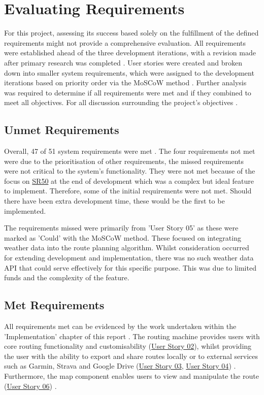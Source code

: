 \clearpage
\section{Evaluating Requirements}
\label{evaluation:requirements}

For this project, assessing its success based solely on the fulfillment of the defined requirements might not provide a comprehensive evaluation. All requirements were established ahead of the three development iterations, with a revision made after primary research was completed . User stories were created and broken down into smaller system requirements, which were assigned to the development iterations based on priority order via the MoSCoW method . Further analysis was required to determine if all requirements were met and if they combined to meet all objectives. For all discussion surrounding the project's objectives .

\subsection{Unmet Requirements}
Overall, 47 of 51 system requirements were met . The four requirements not met were due to the prioritisation of other requirements, the missed requirements were not critical to the system's functionality. They were not met because of the focus on \hyperref[SR:50]{SR50} at the end of development which was a complex but ideal feature to implement. Therefore, some of the initial requirements were not met. Should there have been extra development time, these would be the first to be implemented.

The requirements missed were primarily from 'User Story 05'  as these were marked as 'Could' with the MoSCoW method. These focused on integrating weather data into the route planning algorithm. Whilst consideration occurred for extending development and implementation, there was no such weather data API that could serve effectively for this specific purpose. This was due to limited funds and the complexity of the feature.

\subsection{Met Requirements}
\label{evaluation:requirements:met}
All requirements met can be evidenced by the work undertaken within the 'Implementation' chapter of this report . The routing machine provides users with core routing functionality and customisability (\hyperref[tab:user-story-02]{User Story 02}), whilst providing the user with the ability to export and share routes locally or to external services such as Garmin, Strava and Google Drive (\hyperref[tab:user-story-03]{User Story 03}, \hyperref[tab:user-story-04]{User Story 04}) . Furthermore, the map component enables users to view and manipulate the route (\hyperref[tab:user-story-06]{User Story 06}) .

